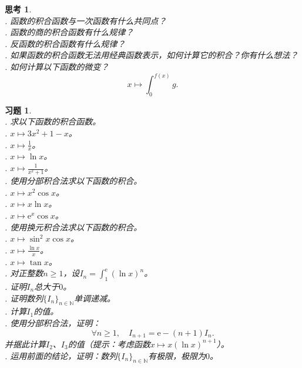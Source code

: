 \documentclass[12pt,UTF8]{ctexbook}
\theoremstyle{definition}
\theoremstyle{plain}
\newtheorem{sk}{思考}[section]
\newtheorem{xt}{习题}[section]
\begin{document}
\begin{sk}
    \mbox{} \\
    . 函数的积合函数与一次函数有什么共同点？ \\
    . 函数的商的积合函数有什么规律？\\
    . 反函数的积合函数有什么规律？\\
    . 如果函数的积合函数无法用经典函数表示，如何计算它的积合？你有什么想法？\\
    . 如何计算以下函数的微变？
    $$x\mapsto \int_0^{f(x)} g.$$
\end{sk}

\begin{xt}
    \mbox{} \\
    . 求以下函数的积合函数。\\
    . $x\mapsto 3x^2 + 1 - x$。\\
    . $x\mapsto \frac{1}{x}$。\\
    . $x\mapsto \ln{x}$。\\
    . $x\mapsto \frac{1}{x^2 + 1}$。\\
    . 使用分部积合法求以下函数的积合。\\
    . $x\mapsto x^2 \cos{x}$。 \\
    . $x\mapsto x \ln{x} $。 \\
    . $x\mapsto \mathrm{e}^x \cos{x} $。 \\
    . 使用换元积合法求以下函数的积合。\\
    . $x\mapsto \sin^2{x} \cos{x}$。 \\
    . $x\mapsto \frac{\ln{x}}{x} $。 \\
    . $x\mapsto \tan{x} $。 \\
    . 对正整数$n\geqslant 1$，设$\displaystyle I_n = \int_1^{\mathrm{e}} \left(\ln{x}\right)^n$。\\
    . 证明$I_n$总大于$0$。\\
    . 证明数列$\{I_n\}_{n\in\mathbb{N}}$单调递减。\\
    . 计算$I_1$的值。\\
    . 使用分部积合法，证明：
    $$ \forall n \geqslant 1,\quad I_{n+1} = \mathrm{e} - (n+1)I_n.$$
    \indent 并据此计算$I_2$、$I_3$的值（提示：考虑函数$x\mapsto x\left(\ln{x}\right)^{n+1}$）。\\
    . 运用前面的结论，证明：数列$\{I_n\}_{n\in\mathbb{N}}$有极限，极限为$0$。\\

\end{xt}
\end{document}
